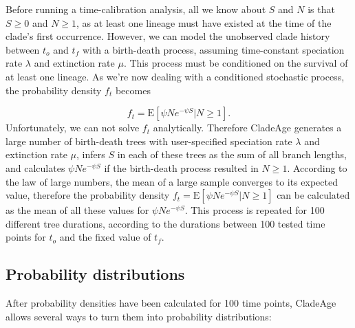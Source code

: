 \documentclass{article}
\begin{document}
Before running a time-calibration analysis, all we know about $S$ and $N$ is that $S \geq 0$ and $N \geq 1$, as at least one lineage must have existed at the time of the clade's first occurrence. However, we can model the unobserved clade history between $t_o$ and $t_f$ with a birth-death process, assuming time-constant speciation rate $\lambda$ and extinction rate $\mu$. This process must be conditioned on the survival of at least one lineage. As we're now dealing with a conditioned stochastic process, the probability density $f_t$ becomes

\begin{equation}
f_t = \mathrm{E}[\psi N e^{-\psi S} | N \geq 1].
\end{equation}
Unfortunately, we can not solve $f_t$ analytically. Therefore CladeAge generates a large number of birth-death trees with user-specified speciation rate $\lambda$ and extinction rate $\mu$, infers $S$ in each of these trees as the sum of all branch lengths, and calculates $\psi N e^{-\psi S}$ if the birth-death process resulted in $N \geq 1$. According to the law of large numbers, the mean of a large sample converges to its expected value, therefore the probability density $f_t = \mathrm{E}[\psi N e^{-\psi S} | N \geq 1]$ can be calculated as the mean of all these values for $\psi N e^{-\psi S}$. This process is repeated for 100 different tree durations, according to the durations between 100 tested time points for $t_o$ and the fixed value of $t_f$.

\subsection{Probability distributions}

After probability densities have been calculated for 100 time points, CladeAge allows several ways to turn them into probability distributions:
\end{document}

